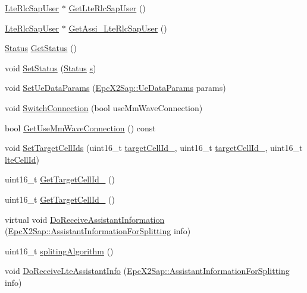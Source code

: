 \begin{DoxyCompactItemize}
\item 
\hyperlink{classns3_1_1LteRlcSapUser}{Lte\+Rlc\+Sap\+User} $\ast$ \hyperlink{classns3_1_1McEnbPdcp_a8be9a7e847c1645a3163bc578cf7d341}{Get\+Lte\+Rlc\+Sap\+User} ()
\item 
\hyperlink{classns3_1_1LteRlcSapUser}{Lte\+Rlc\+Sap\+User} $\ast$ \hyperlink{classns3_1_1McEnbPdcp_aef129552c2d2abecd7b69090dd5a936c}{Get\+Assi\+\_\+\+Lte\+Rlc\+Sap\+User} ()
\item 
\hyperlink{structns3_1_1McEnbPdcp_1_1Status}{Status} \hyperlink{classns3_1_1McEnbPdcp_a93223c298185024561111fc91e20ad45}{Get\+Status} ()
\item 
void \hyperlink{classns3_1_1McEnbPdcp_a7bfde42c1e998b287fd4f74c290fe7e8}{Set\+Status} (\hyperlink{structns3_1_1McEnbPdcp_1_1Status}{Status} \hyperlink{generate__test__data__lte__sinr_8m_ad83eeb3a142285d1243a08c6b7026df8}{s})
\item 
void \hyperlink{classns3_1_1McEnbPdcp_a6b59430cf0703163a160d72f3f6ea322}{Set\+Ue\+Data\+Params} (\hyperlink{structns3_1_1EpcX2Sap_1_1UeDataParams}{Epc\+X2\+Sap\+::\+Ue\+Data\+Params} params)
\item 
void \hyperlink{classns3_1_1McEnbPdcp_ad0c8cc5a0251bd706d560d93220be5b9}{Switch\+Connection} (bool use\+Mm\+Wave\+Connection)
\item 
bool \hyperlink{classns3_1_1McEnbPdcp_a0256e39d22bf41436b2265dad2a9a825}{Get\+Use\+Mm\+Wave\+Connection} () const 
\item 
void \hyperlink{classns3_1_1McEnbPdcp_ae90a9b429a71bd0c25778cf23d3e3467}{Set\+Target\+Cell\+Ids} (uint16\+\_\+t \hyperlink{classns3_1_1McEnbPdcp_a543097504b40179c297529d19a07165d}{target\+Cell\+Id\+\_}, uint16\+\_\+t \hyperlink{classns3_1_1McEnbPdcp_a6dc7c7ba7f3f52242b52efd2aac0ac72}{target\+Cell\+Id\+\_}, uint16\+\_\+t \hyperlink{classns3_1_1McEnbPdcp_aca14fae296ce8719d9a007bb6dac8168}{lte\+Cell\+Id})
\item 
uint16\+\_\+t \hyperlink{classns3_1_1McEnbPdcp_aeaa494fa602340b1d9cb38d37bc1b0ce}{Get\+Target\+Cell\+Id\+\_} ()
\item 
uint16\+\_\+t \hyperlink{classns3_1_1McEnbPdcp_aab8dcc9a9e798a665eb1378104349ba6}{Get\+Target\+Cell\+Id\+\_} ()
\item 
virtual void \hyperlink{classns3_1_1McEnbPdcp_acbb1430172105fb583ffe00510e408d3}{Do\+Receive\+Assistant\+Information} (\hyperlink{structns3_1_1EpcX2Sap_1_1AssistantInformationForSplitting}{Epc\+X2\+Sap\+::\+Assistant\+Information\+For\+Splitting} info)
\item 
uint16\+\_\+t \hyperlink{classns3_1_1McEnbPdcp_a3c113859d00be89b0622f32eb28cbce8}{spliting\+Algorithm} ()
\item 
void \hyperlink{classns3_1_1McEnbPdcp_a7a5a73bb40beb13229651758594002c9}{Do\+Receive\+Lte\+Assistant\+Info} (\hyperlink{structns3_1_1EpcX2Sap_1_1AssistantInformationForSplitting}{Epc\+X2\+Sap\+::\+Assistant\+Information\+For\+Splitting} info)
\end{DoxyCompactItemize}
